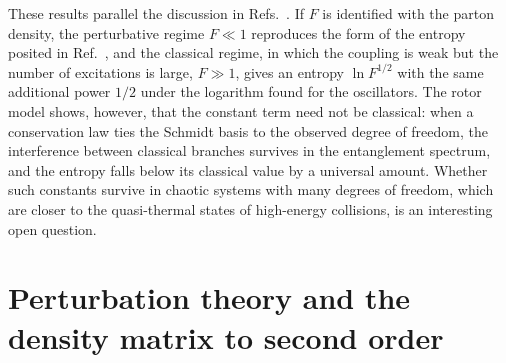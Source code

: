 \documentclass[aps,preprint,12pt,superscriptaddress,nofootinbib]{revtex4-2}
\begin{document}
These results parallel the discussion in Refs.~\cite{DKS,KharzeevLevin}. If $F$ is
identified with the parton density, the perturbative regime $F\ll1$ reproduces the
form of the entropy posited in Ref.~\cite{KharzeevLevin}, and the classical regime,
in which the coupling is weak but the number of excitations is large, $F\gg1$, gives
an entropy $\ln F^{1/2}$ with the same additional power $1/2$ under the logarithm
found for the oscillators. The rotor model shows, however, that the constant term
need not be classical: when a conservation law ties the Schmidt basis to the
observed degree of freedom, the interference between classical branches survives in
the entanglement spectrum, and the entropy falls below its classical value by a
universal amount. Whether such constants survive in chaotic systems with many
degrees of freedom, which are closer to the quasi-thermal states of high-energy
collisions, is an interesting open question.

\begin{acknowledgments}
[To be completed.]
\end{acknowledgments}

\appendix

\section{Perturbation theory and the density matrix to second order}
\label{app:pt}
\end{document}
